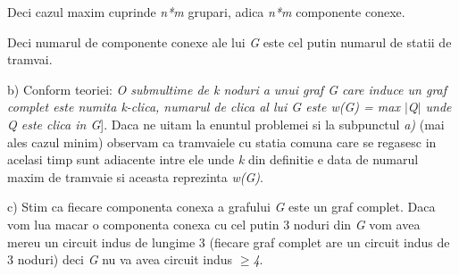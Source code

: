 \documentclass{article}
\begin{document}
       Deci cazul maxim cuprinde \textit{n*m} grupari, adica \textit{n*m} componente conexe.
    
      Deci numarul de componente conexe ale lui \textit{G} este cel putin numarul de statii de tramvai.
     
b) Conform teoriei: \textit{O submultime de k noduri a unui graf G care induce un graf complet este numita k-clica, numarul de clica al lui G este w(G) = max $\mid$Q$\mid$ unde Q este clica in G}].
    \newline
    \quad Daca ne uitam la enuntul problemei si la subpunctul \textit{a)} (mai ales cazul minim) observam ca tramvaiele cu statia comuna care se regasesc in acelasi timp sunt adiacente intre ele unde \textit{k} din definitie e data de numarul maxim de tramvaie si aceasta reprezinta \textit{w(G)}.  
     
c) Stim ca fiecare componenta conexa a grafului \textit{G} este un graf complet. Daca vom lua macar o componenta conexa cu cel putin 3 noduri din \textit{G} vom avea mereu un circuit indus de lungime 3 (fiecare graf complet are un circuit indus de 3 noduri) deci \textit{G} nu va avea circuit indus \textit{$\geq$4}.
\end{document}
